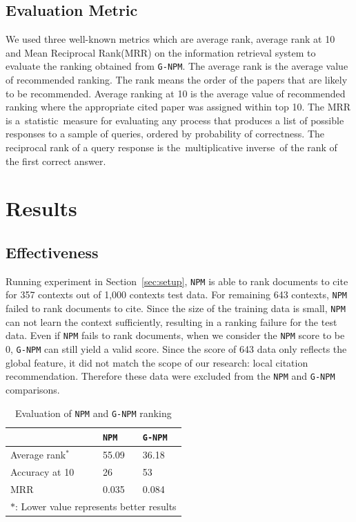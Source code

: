 \documentclass{llncs}
\newcommand{\name}{\texttt{G-NPM}\xspace}
\newcommand{\npm}{\texttt{NPM}\xspace}
\begin{document}
\subsection{Evaluation Metric}
\label{sec:metric}
We used three well-known metrics which are average rank, average rank at 10 and Mean Reciprocal Rank(MRR) on the information retrieval system to evaluate the ranking obtained from \name. The average rank is the average value of recommended ranking. The rank means the order of the papers that are likely to be recommended. Average ranking at 10 is the average value of recommended ranking where the appropriate cited paper was assigned within top 10. The MRR is a statistic measure for evaluating any process that produces a list of possible responses to a sample of queries, ordered by probability of correctness. The reciprocal rank of a query response is the multiplicative inverse of the rank of the first correct answer.


\section{Results}

\subsection{Effectiveness}
Running experiment in Section~\ref{sec:setup}, \npm is able to rank documents to cite for 357 contexts out of 1,000 contexts test data. For remaining 643 contexts, \npm failed to rank documents to cite. Since the size of the training data is small, \npm can not learn the context sufficiently, resulting in a ranking failure for the test data. Even if \npm fails to rank documents, when we consider the \npm score to be 0, \name can still yield a valid score. Since the score of 643 data only reflects the global feature, it did not match the scope of our research: local citation recommendation. Therefore these data were excluded from the \npm and \name comparisons.

\begin{table}[ht]
\centering
\begin{tabular}{l || p{} | p{}}
\toprule
& \npm & \name \\
\midrule
Average rank$^\ast$ & 55.09 & 36.18 \\
Accuracy at 10 & 26 & 53 \\
MRR & 0.035 & 0.084\\
\midrule
\multicolumn{3}{l}{$\ast$: Lower value represents better results} \\
\bottomrule
\end{tabular}
\caption{Evaluation of \npm and \name ranking}\label{table:rq1}
\end{table}
\end{document}
